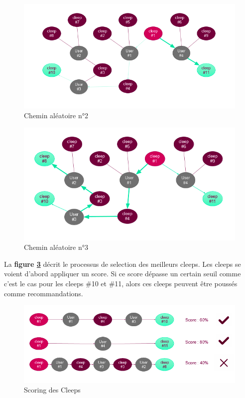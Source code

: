 \documentclass{article} %
\begin{document}
\begin{figure}[!h]
	\centering
	\includegraphics[keepaspectratio = true,scale=0.6]{ex3}
	\caption{Chemin aléatoire n°2}
	\label{fig:ex3}
\end{figure}

\begin{figure}[!h]
	\centering
	\includegraphics[keepaspectratio = true,scale=0.6]{ex4}
	\caption{Chemin aléatoire n°3}
	\label{fig:ex4}
\end{figure}

La \textbf{figure \ref{fig:ex5}} décrit le processus de selection des meilleurs cleeps. Les cleeps se voient d'abord appliquer un score. Si ce score dépasse un certain seuil comme c'est le cas pour les cleeps \#10 et \#11, alors ces cleeps peuvent être poussés comme recommandations.

\begin{figure}[!h]
	\centering
	\includegraphics[keepaspectratio = true,scale=0.6]{ex5}
	\caption{Scoring des Cleeps}
	\label{fig:ex5}
\end{figure}
\newpage
\end{document}
